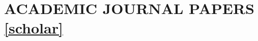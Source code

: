 \documentclass[paper=letter,fontsize=11pt]{scrartcl} %
\newcommand{\NewPart}[2]{\section*{\uppercase{#1} #2}}
\begin{document}

\newpage


\NewPart{Academic Journal Papers}{\href{https://scholar.google.ch/citations?user=wZ9f8CAAAAAJ}{[scholar]}}
\end{document}
